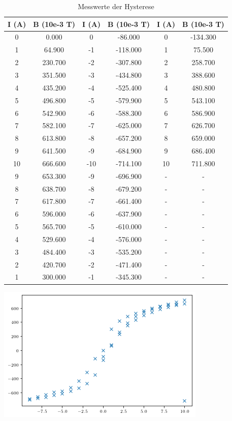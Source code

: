 \begin{table}
\centering
\caption{Messwerte der Hysterese}
\begin{tabular}{c c c c c c}
  \toprule
   I (A) &  B (10e-3 T) &  I (A) &  B (10e-3 T) &  I (A) &  B (10e-3 T)\\
  \midrule
     0 &        0.000 &         0 &      -86.000 &   0 &     -134.300 \\
     1 &       64.900 &        -1 &     -118.000 &   1 &       75.500 \\
     2 &      230.700 &        -2 &     -307.800 &   2 &      258.700 \\
     3 &      351.500 &        -3 &     -434.800 &   3 &      388.600 \\
     4 &      435.200 &        -4 &     -525.400 &   4 &      480.800 \\
     5 &      496.800 &        -5 &     -579.900 &   5 &      543.100 \\
     6 &      542.900 &        -6 &     -588.300 &   6 &      586.900 \\
     7 &      582.100 &        -7 &     -625.000 &   7 &      626.700 \\
     8 &      613.800 &        -8 &     -657.200 &   8 &      659.000 \\
     9 &      641.500 &        -9 &     -684.900 &   9 &      686.400 \\
    10 &      666.600 &       -10 &     -714.100 &  10 &      711.800 \\
     9 &      653.300 &        -9 &     -696.900 &  -  &        -     \\
     8 &      638.700 &        -8 &     -679.200 &  -  &        -     \\
     7 &      617.800 &        -7 &     -661.400 &  -  &        -     \\
     6 &      596.000 &        -6 &     -637.900 &  -  &        -     \\
     5 &      565.700 &        -5 &     -610.000 &  -  &        -     \\
     4 &      529.600 &        -4 &     -576.000 &  -  &        -     \\
     3 &      484.400 &        -3 &     -535.200 &  -  &        -     \\
     2 &      420.700 &        -2 &     -471.400 &  -  &        -     \\
     1 &      300.000 &        -1 &     -345.300 &  -  &        -     \\
  \bottomrule
  \end{tabular}
\end{table}

\includegraphics[width=\textwidth]{pictures/HysteresekurveGemessen.png}    %